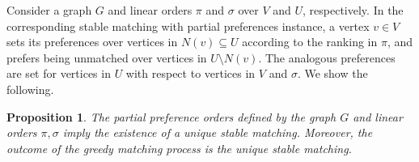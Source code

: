 \documentclass[11pt]{article}
\numberwithin{equation}{section}
\newtheorem{proposition}[theorem]{Proposition}
\theoremstyle{definition}
\theoremstyle{plain}
\theoremstyle{plain}
\begin{document}
Consider a graph $G$ and linear orders $\pi$ and $\sigma$ over $V$ and $U$, respectively. In the corresponding stable matching with partial preferences instance, a vertex $v\in V$ sets its preferences over vertices in $N(v)\subseteq U$ according to the ranking in $\pi$, and prefers being unmatched over vertices in $U\setminus N(v)$. The analogous preferences are set for vertices in $U$ with respect to vertices in $V$ and $\sigma$. 
%
%
%
%
%
%
%
%
%
%
%
%
%
%
%
%
%
%
%
%
We show the following.

\begin{proposition}
	The partial preference orders defined by the graph $G$ and linear orders $\pi,\sigma$ imply the existence of a unique stable matching. 
	Moreover, the outcome of the greedy matching process is the unique stable matching. 
\end{proposition}
\end{document}
